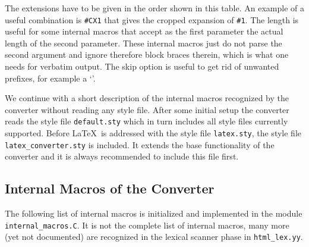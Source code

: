\documentclass[12pt]{article}
\begin{document}
The extensions have to be given in the order shown in this table. An
example of a useful combination is {\tt \#CX1} that gives the cropped
expansion of {\tt \#1}. The length is useful for some internal macros
that accept as the first parameter the actual length of the second
parameter.  These internal macros just do not parse the second
argument and ignore therefore block braces therein, which is what one
needs for verbatim output. The skip option is useful to get rid of
unwanted prefixes, for example a `{\tt \Backslash}'.

We continue with a short description of the internal macros recognized
by the converter without reading any style file. After some initial
setup the converter reads the style file {\tt default.sty} which in
turn includes all style files currently supported. Before \LaTeX\ is
addressed with the style file {\tt latex.sty}, the style file {\tt
  latex\_converter.sty} is included. It extends the base functionality
of the converter and it is always recommended to include this file
first.

\subsection{Internal Macros of the Converter}

The following list of internal macros is initialized and implemented
in the module {\tt internal\_macros.C}. It is not the complete list of
internal macros, many more (yet not documented) are recognized in the
lexical scanner phase in {\tt html\_lex.yy}.
\end{document}
